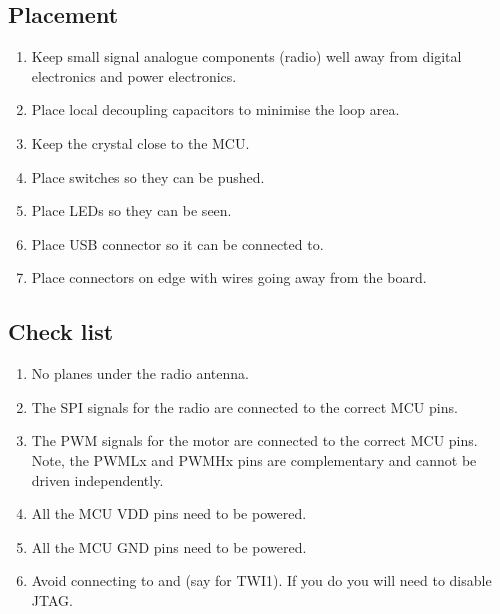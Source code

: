 \subsection{Placement}\label{placement}

\begin{enumerate}
\item
  Keep small signal analogue components (radio) well away from digital
  electronics and power electronics.
\item
  Place local decoupling capacitors to minimise the loop area.
\item
  Keep the crystal close to the MCU.
\item
  Place switches so they can be pushed.
\item
  Place LEDs so they can be seen.
\item
  Place USB connector so it can be connected to.
\item
  Place connectors on edge with wires going away from the board.
\end{enumerate}

\subsection{Check list}\label{check-list}

\begin{enumerate}
\item
  No planes under the radio antenna.
\item
  The SPI signals for the radio are connected to the correct MCU pins.
\item
  The PWM signals for the motor are connected to the correct MCU pins.
  Note, the PWMLx and PWMHx pins are complementary and cannot be driven
  independently.
\item
  All the MCU VDD pins need to be powered.
\item
  All the MCU GND pins need to be powered.
\item
  Avoid connecting to  and  (say for TWI1).  If you do you will need to disable JTAG.
\end{enumerate}

